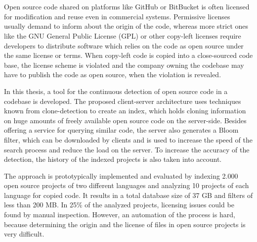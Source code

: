 \chapter{\abstractname}
Open source code shared on platforms like GitHub or BitBucket is often licensed for modification and reuse even in commercial systems.
Permissive licenses usually demand to inform about the origin of the code, whereas more strict ones like the GNU General Public License (GPL) or other copy-left licenses require developers to distribute software which relies on the code as open source under the same license or terms.
When copy-left code is copied into a close-sourced code base, the license scheme is violated and the company owning the codebase may have to publish the code as open source, when the violation is revealed.

In this thesis, a tool for the continuous detection of open source code in a codebase is developed.
The proposed client-server architecture uses techniques known from clone-detection to create an index, which holds cloning information on huge amounts of freely available open source code on the server-side.
Besides offering a service for querying similar code, the server also generates a Bloom filter, which can be downloaded by clients and is used to increase the speed of the search process and reduce the load on the server.
To increase the accuracy of the detection, the history of the indexed projects is also taken into account.

The approach is prototypically implemented and evaluated by indexing 2.000 open source projects of two different languages and analyzing 10 projects of each language for copied code.
It results in a total database size of 37 GB and filters of less than 200 MB.
In 25\% of the analyzed projects, licensing issues could be found by manual inspection.
However, an automation of the process is hard, because determining the origin and the license of files in open source projects is very difficult.